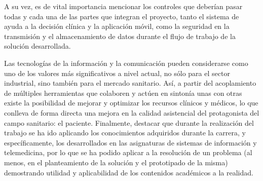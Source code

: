 \documentclass{article}
\begin{document}
A su vez, es de vital importancia mencionar los controles que deberían
pasar todas y cada una de las partes que integran el  proyecto,  tanto
el sistema de ayuda a la decisión clínica y la aplicación móvil,  como
la seguridad en la transmisión y el almacenamiento de datos durante el
flujo de trabajo de la solución desarrollada.

Las  tecnologías  de  la  información	y   la	 comunicación	pueden
considerarse como uno  de  los	valores  más  significativos  a  nivel
actual, no sólo para  el  sector  industrial,  sino  también  para  el
mercado sanitario.   Así,  a  partir  del  acoplamiento  de  múltiples
herramientas que colaboren y actúen en sintonía unas con otras	existe
la posibilidad de mejorar y optimizar los recursos clínicos y médicos,
lo que conlleva de forma directa una mejora en la calidad  asistencial
del  protagonista  del	campo  sanitario:  el  paciente.   Finalmente,
destacar que durante la realización del trabajo se  ha	ido  aplicando
los conocimientos adquiridos durante la  carrera,  y  específicamente,
los desarrollados en las asignaturas  de  sistemas  de	información  y
telemedicina, por lo que se ha podido aplicar a la  resolución	de  un
problema  (al  menos,  en  el  planteamiento  de  la  solución	y   el
prototipado de la misma) demostrando utilidad y aplicabilidad  de  los
contenidos académicos a la realidad.
\end{document}
